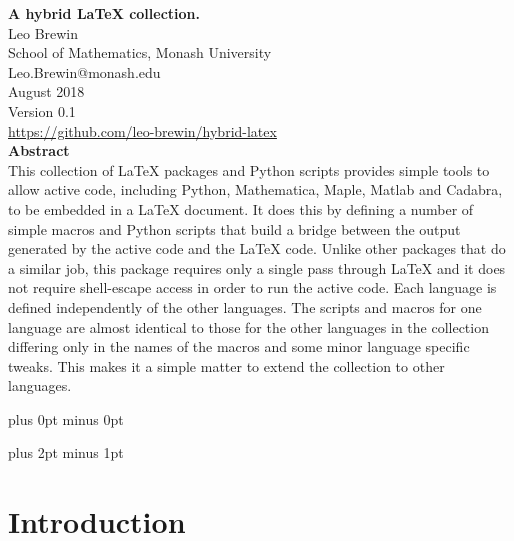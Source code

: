 \documentclass[12pt]{article}
\begin{document}


\begin{center}
   {\Large\bf A hybrid LaTeX collection.}\\[20pt]
   {Leo Brewin}\\[5pt]
   {School of Mathematics, Monash University}\\[5pt]
   {\tts Leo.Brewin@monash.edu}\\[5pt]
   {August 2018}\\[10pt]
   {Version 0.1}\\[10pt]
   {\href{https://github.com/leo-brewin/hybrid-latex}{https://github.com/leo-brewin/hybrid-latex}}\\[20pt]
   {\bf\small Abstract}\\[10pt]
   {\small{}%
      {This collection of LaTeX packages and Python scripts provides simple tools
      to allow active code, including Python, Mathematica, Maple, Matlab and
      Cadabra, to be embedded in a LaTeX document. It does this by defining a
      number of simple macros and Python scripts that build a bridge between the
      output generated by the active code and the LaTeX code. Unlike other
      packages that do a similar job, this package requires only a single pass
      through LaTeX and it does not require shell-escape access in order to run
      the active code. Each language is defined independently of the other
      languages. The scripts and macros for one language are almost identical to
      those for the other languages in the collection differing only in the names
      of the macros and some minor language specific tweaks. This makes it a
      simple matter to extend the collection to other languages.}}
\end{center}

\vskip 1cm

\parindent=0pt
\parskip=0pt plus 0pt minus 0pt

\tableofcontents

\vfill

\clearpage

\parindent=0pt
\parskip=8pt plus 2pt minus 1pt

\section{Introduction}
\end{document}
